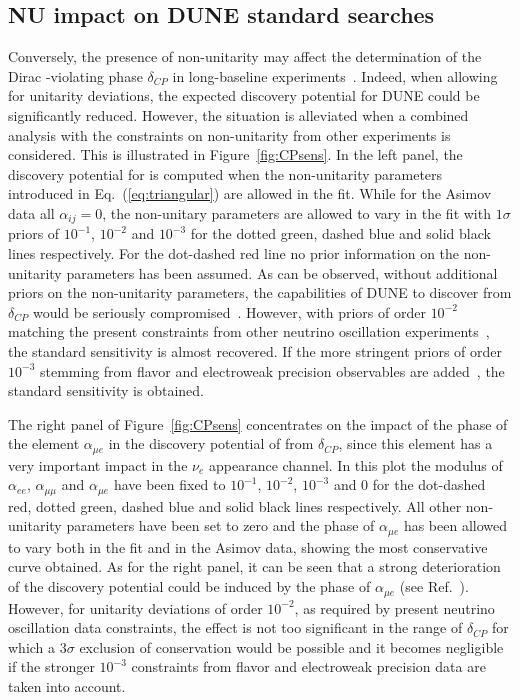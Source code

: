 \subsection{NU impact on DUNE standard searches}
Conversely, the presence of non-unitarity may affect the determination of the
Dirac -violating phase $\delta_{CP}$ in long-baseline experiments~\cite{Miranda:2016wdr,Fernandez-Martinez:2016lgt,Escrihuela:2016ube}.
Indeed, when allowing for unitarity deviations, the expected  discovery potential for DUNE could be significantly reduced.
However, the situation is alleviated when a combined analysis with the constraints on non-unitarity from other experiments is considered. This is illustrated in Figure~\ref{fig:CPsens}. In the left panel, the discovery potential for  is computed when the non-unitarity parameters introduced in Eq.~(\ref{eq:triangular}) are allowed in the fit. While for the Asimov data all $\alpha_{ij}=0$, the non-unitary parameters are allowed to vary in the fit with $1 \sigma$ priors of $10^{-1}$, $10^{-2}$ and $10^{-3}$ for the dotted green, dashed blue and solid black lines respectively. For the dot-dashed red line no prior information on the non-unitarity parameters has been assumed. As can be observed, without additional priors on the non-unitarity parameters, the capabilities of DUNE to discover  from $\delta_{CP}$ would be seriously compromised~\cite{Escrihuela:2016ube}. However, with priors of order $10^{-2}$ matching the present constraints from other neutrino oscillation experiments~\cite{Escrihuela:2016ube,Blennow:2016jkn}, the standard sensitivity is almost recovered. If the more stringent priors of order $10^{-3}$ stemming from flavor and electroweak precision observables are added~\cite{Antusch:2014woa,Fernandez-Martinez:2016lgt}, the standard sensitivity is obtained.   

The right panel of Figure~\ref{fig:CPsens} concentrates on the impact of the phase of the element $\alpha_{\mu e}$ in the discovery potential of  from $\delta_{CP}$, since this element has a very important impact in the $\nu_e$ appearance channel. In this plot the modulus of $\alpha_{ee}$, $\alpha_{\mu \mu}$ and $\alpha_{\mu e}$ have been fixed to $10^{-1}$, $10^{-2}$, $10^{-3}$ and 0 for the dot-dashed red, dotted green, dashed blue and solid black lines respectively. All other non-unitarity parameters have been set to zero and the phase of $\alpha_{\mu e}$ has been allowed to vary both in the fit and in the Asimov data, showing the most conservative curve obtained. As for the right panel, it can be seen that a strong deterioration of the  discovery potential could be induced by the phase of $\alpha_{\mu e}$ (see Ref.~\cite{Escrihuela:2016ube}). However, for unitarity deviations of order $10^{-2}$, as required by present neutrino oscillation data constraints, the effect is not too significant in the range of $\delta_{CP}$ for which a $3 \sigma$ exclusion of  conservation would be possible and it becomes negligible if the stronger $10^{-3}$ constraints from flavor and electroweak precision data are taken into account.  

